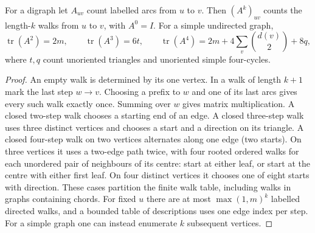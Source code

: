 \begin{proposition}\leavevmode\label{idx:elementary-adjacency-powers-triangles-and-quadrangles}
For a digraph let $A_{uv}$ count labelled arcs from $u$ to $v$.
Then $(A^k)_{uv}$ counts the length-$k$ walks from $u$ to $v$, with
$A^0=I$. For a simple undirected graph,
\[
 \operatorname{tr}(A^2)=2m,\qquad \operatorname{tr}(A^3)=6t,\qquad
 \operatorname{tr}(A^4)=2m+4\sum_v\binom{d(v)}2+8q,
\]
where $t,q$ count unoriented triangles and unoriented simple four-cycles.
\end{proposition}
\begin{proof}
An empty walk is determined by its one vertex. In a walk of length $k+1$
mark the last step $w\to v$. Choosing a prefix to $w$ and one of its last arcs
gives every such walk exactly once. Summing over $w$ gives matrix multiplication.
A closed two-step walk chooses a starting end of an edge. A closed three-step
walk uses three distinct vertices and chooses a start and a direction on its
triangle. A closed four-step walk on two vertices alternates along one edge
(two starts). On three vertices it uses a two-edge path twice, with four
rooted ordered walks for each unordered pair of neighbours of its centre:
start at either leaf, or start at the centre with either first leaf. On four
distinct vertices it chooses one of eight starts with direction. These cases
partition the finite walk table, including walks in graphs containing chords.
For fixed $u$ there are at most $\max(1,m)^k$ labelled directed walks,
and a bounded table of descriptions uses one edge index per step. For a
simple graph one can instead enumerate $k$ subsequent vertices.
\end{proof}

